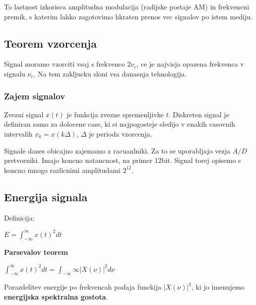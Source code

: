 \documentclass{article}
\begin{document}
\begin{multicols}{4}
	To lastnost izkorisca amplitudna modulacija (radijske postaje AM) in frekvencni premik, s katerim lahko zagotovimo
	hkraten prenos vec signalov po istem mediju.

	\subsection{Teorem vzorcenja}
	Signal moramo vzorciti vsaj s frekvenco $2 \nu_c$, ce je najvisja opazena frekvenca v signalu $\nu_c$. Na tem zakljucku
	sloni vsa danasnja tehnologija.

	\subsubsection{Zajem signalov}
	Zvezni signal $x(t)$ je funkcija zvezne spremenljivke $t$. Diskreten signal je definiran samo za dolocene case, ki
	si najpogosteje sledijo v enakih casovnih intervalih $x_k = x(k \Delta)$, $\Delta$ je perioda vzorcenja.

	Signale danes obicajno zajemamo z racuanlniki. Za to se uporabljajo vezja $A/D$ pretvorniki. Imajo koncno natancnost,
	na primer 12bit. Signal torej opisemo s koncno mnogo razlicnimi amplitudami $2^{12}$.

	\subsection{Energija signala}
	Definicija:
	\begin{center}
		\begin{math}
			E = \int_{-\infty}^{\infty} x(t)^2 dt
		\end{math}
	\end{center}

	\textbf{Parsevalov teorem}
	\begin{center}
		\begin{math}
			\int_{-\infty}^{\infty} x(t)^2 dt = \int_{-\infty}{\infty} |X(\nu)|^2 d\nu
		\end{math}
	\end{center}

	Porazdelitev energije po frekvencah podaja funckija $|X(\nu)|^2$, ki jo imenujemo \textbf{energijska spektralna gostota}.


\end{multicols}
\end{document}
